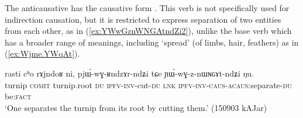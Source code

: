 % 

The anticausative  has the causative form . This verb is not specifically used for indirection causation, but it is restricted to express separation of two entities from each other, as in (\ref{ex:YWwGznWNGAtndZi2}), unlike the base verb  which has a broader range of meanings, including `spread' (of limbs, hair, feathers) as in (\ref{ex:Wjme.YWqAt}).

\begin{exe}
\ex \label{ex:YWwGznWNGAtndZi2}
\gll rasti cʰo rɤjndoʁ ni, pjɯ́-wɣ-ʁndzɤr-ndʑi tɕe ɲɯ́-wɣ-z-nɯɴɢɤt-ndʑi ŋu.\\
turnip \textsc{comit} turnip.root \textsc{du} \textsc{ipfv}-\textsc{inv}-cut-\textsc{du} \textsc{lnk} \textsc{ipfv}-\textsc{inv}-\textsc{caus}-\textsc{acaus}:separate-\textsc{du} be:\textsc{fact}\\
\glt `One separates the turnip from its root by cutting them.' (150903 kAJar)
\end{exe}

